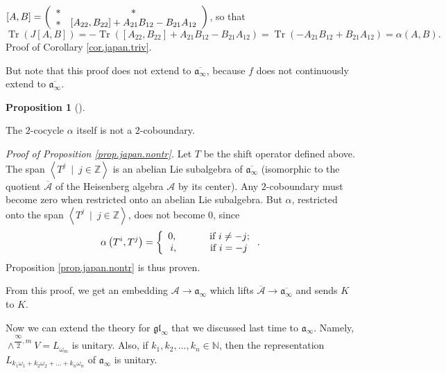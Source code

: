 \documentclass
[numbers=enddot,12pt,final,onecolumn,german,notitlepage]{scrartcl}%
\theoremstyle{definition}
\newtheorem{prop}[theo]{Proposition}
\newenvironment{proposition}[1][]
{\begin{prop}[#1]\begin{leftbar}}
{\end{leftbar}\end{prop}}
\begin{document}
$\left[  A,B\right]  =\left(
\begin{array}
[c]{cc}%
\ast & \ast\\
\ast & \left[  A_{22},B_{22}\right]  +A_{21}B_{12}-B_{21}A_{12}%
\end{array}
\right)  $, so that
\[
\operatorname*{Tr}\left(  J\left[  A,B\right]  \right)  =-\operatorname*{Tr}%
\left(  \left[  A_{22},B_{22}\right]  +A_{21}B_{12}-B_{21}A_{12}\right)
=\operatorname*{Tr}\left(  -A_{21}B_{12}+B_{21}A_{12}\right)  =\alpha\left(
A,B\right)  .
\]
Proof of Corollary \ref{cor.japan.triv}.

But note that this proof does not extend to $\overline{\mathfrak{a}_{\infty}}%
$, because $f$ does not continuously extend to $\overline{\mathfrak{a}%
_{\infty}}$.

\begin{proposition}
\label{prop.japan.nontr}The $2$-cocycle $\alpha$ itself is not a $2$-coboundary.
\end{proposition}

\textit{Proof of Proposition \ref{prop.japan.nontr}.} Let $T$ be the shift
operator defined above. The span $\left\langle T^{j}\ \mid\ j\in
\mathbb{Z}\right\rangle $ is an abelian Lie subalgebra of $\overline
{\mathfrak{a}_{\infty}}$ (isomorphic to the quotient $\overline{\mathcal{A}}$
of the Heisenberg algebra $\mathcal{A}$ by its center). Any $2$-coboundary
must become zero when restricted onto an abelian Lie subalgebra. But $\alpha$,
restricted onto the span $\left\langle T^{j}\ \mid\ j\in\mathbb{Z}%
\right\rangle $, does not become $0$, since%
\[
\alpha\left(  T^{i},T^{j}\right)  =\left\{
\begin{array}
[c]{c}%
0,\ \ \ \ \ \ \ \ \ \ \text{if }i\neq-j;\\
i,\ \ \ \ \ \ \ \ \ \ \text{if }i=-j
\end{array}
\right.  .
\]
Proposition \ref{prop.japan.nontr} is thus proven.

From this proof, we get an embedding $\mathcal{A}\rightarrow\mathfrak{a}%
_{\infty}$ which lifts $\overline{\mathcal{A}}\rightarrow\overline
{\mathfrak{a}_{\infty}}$ and sends $K$ to $K$.

Now we can extend the theory for $\mathfrak{gl}_{\infty}$ that we discussed
last time to $\mathfrak{a}_{\infty}$. Namely, $\wedge^{\dfrac{\infty}{2}%
,m}V=L_{\omega_{m}}$ is unitary. Also, if $k_{1},k_{2},...,k_{n}\in\mathbb{N}%
$, then the representation $L_{k_{1}\omega_{1}+k_{2}\omega_{2}+...+k_{n}%
\omega_{n}}$ of $\mathfrak{a}_{\infty}$ is unitary.
\end{document}
